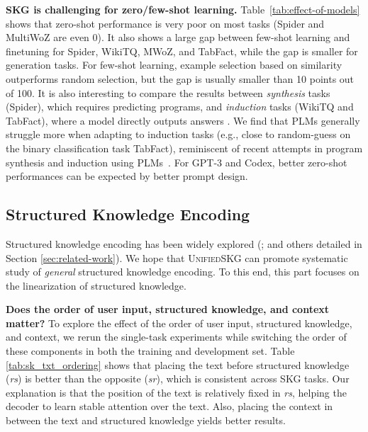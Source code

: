 \textbf{SKG is challenging for zero/few-shot learning. }
Table~\ref{tab:effect-of-models} shows that zero-shot performance is very poor on most tasks (Spider and MultiWoZ are even 0). It also shows a large gap between few-shot learning and finetuning for Spider, WikiTQ, MWoZ, and TabFact, while the gap is smaller for generation tasks. For few-shot learning, example selection based on similarity outperforms random selection, but the gap is usually smaller than 10 points out of 100. It is also interesting to compare the results between \textit{synthesis} tasks (Spider), which requires predicting programs, and \textit{induction} tasks (WikiTQ and TabFact), where a model directly outputs answers \citep{Devlin2017RobustFillNP}. We find that PLMs generally struggle more when adapting to induction tasks (e.g., close to random-guess on the binary classification task TabFact), reminiscent of recent attempts in program synthesis and induction using PLMs~\citep{Austin2021ProgramSW}. For GPT-3 and Codex, better zero-shot performances can be expected by better prompt design. 

\subsection{Structured Knowledge Encoding}
\label{subsec:structured-encoding-analysis}
Structured knowledge encoding has been widely explored (\citealp{Bogin2019GlobalRO,kagnet-emnlp19,agarwal2020knowledge,saxena2020improving,yasunaga2020graph,yasunaga2022dragon}; and others detailed in Section \ref{sec:related-work}). We hope that \textsc{Unified}SKG can promote systematic study of \textit{general} structured knowledge encoding. To this end, this part focuses on the linearization of structured knowledge. 

\textbf{Does the order of user input, structured knowledge, and context matter?} To explore the effect of the order of user input, structured knowledge, and context, we rerun the single-task experiments while switching the order of these components in both the training and development set. Table \ref{tab:sk_txt_ordering} shows that placing the text before structured knowledge (\textit{rs}) is better than the opposite (\textit{sr}), which is consistent across SKG tasks. Our explanation is that the position of the text is relatively fixed in \textit{rs}, helping the decoder to learn stable attention over the text. Also, placing the context in between the text and structured knowledge yields better results.

